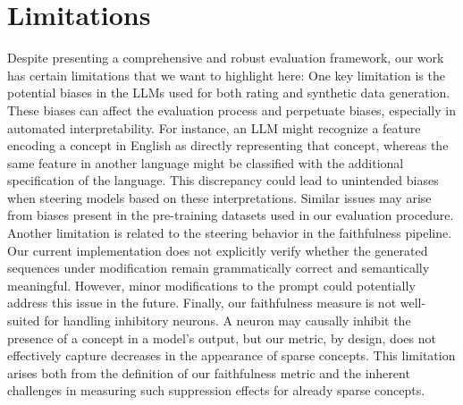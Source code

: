 \section*{Limitations}

Despite presenting a comprehensive and robust evaluation framework, our work has certain limitations that we want to highlight here:
%
One key limitation is the potential biases in the LLMs used for both rating and synthetic data generation. These biases can affect the evaluation process and perpetuate biases, especially in automated interpretability. For instance, an LLM might recognize a feature encoding a concept in English as directly representing that concept, whereas the same feature in another language might be classified with the additional specification of the language. This discrepancy could lead to unintended biases when steering models based on these interpretations. Similar issues may arise from biases present in the pre-training datasets used in our evaluation procedure.
%
Another limitation is related to the steering behavior in the faithfulness pipeline. Our current implementation does not explicitly verify whether the generated sequences under modification remain grammatically correct and semantically meaningful. However, minor modifications to the prompt could potentially address this issue in the future.
%
Finally, our faithfulness measure is not well-suited for handling inhibitory neurons. A neuron may causally inhibit the presence of a concept in a model’s output, but our metric, by design, does not effectively capture decreases in the appearance of sparse concepts. This limitation arises both from the definition of our faithfulness metric and the inherent challenges in measuring such suppression effects for already sparse concepts.